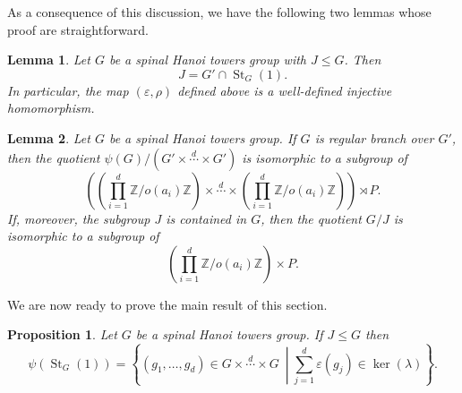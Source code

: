 \documentclass[11pt,leqno]{amsart}
\theoremstyle{plain}
\newtheorem{proposition}[proposition]{Proposition}
\newtheorem{lemma}[lemma]{Lemma}
\DeclareMathOperator{\St}{St}
\numberwithin{equation}{section}
\begin{document}
As a consequence of this discussion, we have the following two lemmas whose proof are straightforward.

\begin{lemma}\label{lem:JeqGprimeSt}
Let $G$ be a spinal Hanoi towers group with $J\leq G$. Then
\[
J=G'\cap \St_G(1).
\]
In particular, the map $(\varepsilon,\rho)$ defined above is a well-defined injective homomorphism.
\end{lemma}

\begin{lemma}Let $G$ be a spinal Hanoi towers group. If $G$ is regular branch over $G'$, then the quotient $\psi(G)/(G'\times \stackrel{d}{\cdots}\times G')$ is isomorphic to a subgroup of 
\[
 \left(\left(\prod_{i=1}^d \mathbb Z/o(a_i)\mathbb Z\right)\times \stackrel{d}{\cdots}\times \left(\prod_{i=1}^d \mathbb Z/o(a_i)\mathbb Z\right)\right)\rtimes P.
\]
If, moreover, the subgroup $J$ is contained in $G$, then
the quotient $G/J$ is isomorphic to a subgroup of
\[
 \left(\prod_{i=1}^d \mathbb Z/o(a_i)\mathbb Z\right)\times P.
\]
\end{lemma}





We are now ready to prove the main result of this section.


\begin{proposition}\label{prop:sufficient-condition-first-stabilizer}
Let $G$ be a spinal Hanoi towers group. If $J\leq G$ then 
\[
\psi(\St_G(1))
=
\left\{
(g_1,\ldots,g_d)\in G\times \stackrel{d}{\cdots}\times G \ \middle| \sum_{j=1}^d \varepsilon(g_j)\in \ker(\lambda)
\right\}.
\]
\end{proposition}
\end{document}
